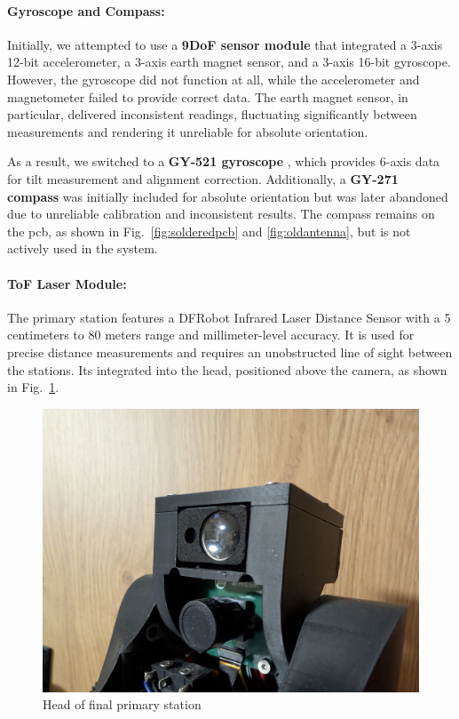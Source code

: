 \paragraph{Gyroscope and Compass:}

Initially, we attempted to use a \textbf{9DoF sensor module} \citep{jwbl_dof_sensor} that integrated a 3-axis 12-bit accelerometer, a 3-axis earth magnet sensor, and a 3-axis 16-bit gyroscope. However, the gyroscope did not function at all, while the accelerometer and magnetometer failed to provide correct data. The earth magnet sensor, in particular, delivered inconsistent readings, fluctuating significantly between measurements and rendering it unreliable for absolute orientation.

As a result, we switched to a \textbf{GY-521 gyroscope} \cite{azdelivery_gy_521}, which provides 6-axis data for tilt measurement and alignment correction. Additionally, a \textbf{GY-271 compass} \cite{azdelivery_gy_271} was initially included for absolute orientation but was later abandoned due to unreliable calibration and inconsistent results. The compass remains on the \acrshort{pcb}, as shown in Fig.~\ref{fig:solderedpcb} and \ref{fig:oldantenna}, but is not actively used in the system.

\paragraph{ToF Laser Module:}
The primary station features a DFRobot Infrared Laser Distance Sensor \cite{dfrobot_ir_sensor} with a 5 centimeters to 80 meters range and millimeter-level accuracy. It is used for precise distance measurements and requires an unobstructed line of sight between the stations. Its integrated into the head, positioned above the camera, as shown in Fig.~\ref{fig:headcloseup}.

\begin{figure}[H]
	\centering
	\includegraphics[width=1.0\linewidth]{figures/head_closeup}
	\caption{Head of final primary station}
	\label{fig:headcloseup}
\end{figure}

